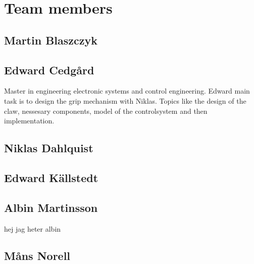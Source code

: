 \section{Team members}

\subsection{Martin Blaszczyk}

\subsection{Edward Cedgård}
Master in engineering electronic systems and control engineering.
Edward main task is to design the grip mechanism with Niklas. Topics like
the design of the claw, nessesary components, model of the controlsystem and then implementation. 

\subsection{Niklas Dahlquist}

\subsection{Edward Källstedt}

\subsection{Albin Martinsson} hej jag heter albin

\subsection{Måns Norell}










